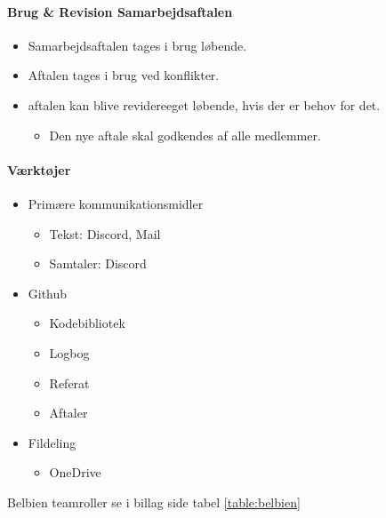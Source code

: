 \paragraph{Brug \& Revision Samarbejdsaftalen}
\begin{itemize}
    \item Samarbejdsaftalen tages i brug løbende.
    \item Aftalen tages i brug ved konflikter.
    \item aftalen kan blive revidereeget løbende, hvis der er behov for det.
    \begin{itemize}
        \item Den nye aftale skal godkendes af alle medlemmer.
    \end{itemize}
\end{itemize}

\paragraph{Værktøjer}
\begin{itemize}
    \item Primære kommunikationsmidler
    \begin{itemize}
        \item Tekst: Discord, Mail
        \item Samtaler: Discord
    \end{itemize}
    \item Github
    \begin{itemize}
        \item Kodebibliotek
        \item Logbog
        \item Referat
        \item Aftaler
    \end{itemize}
    \item Fildeling
    \begin{itemize}
        \item OneDrive
    \end{itemize}
\end{itemize}

Belbien teamroller se i billag side \pageref{table:belbien} tabel \ref{table:belbien} 

